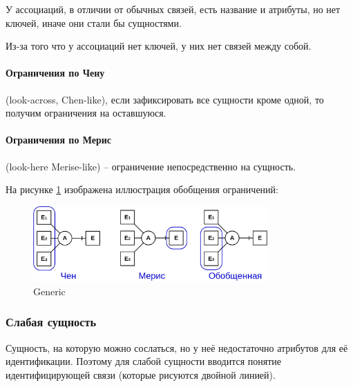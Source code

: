 \begin{remark}
	У ассоциаций, в отличии от обычных связей, есть название и атрибуты, но нет ключей, иначе они стали
	бы сущностями.
\end{remark}

\begin{remark}
	Из-за того что у ассоциаций нет ключей, у них нет связей между собой.
\end{remark}

\paragraph{Ограничения по Чену} (look-across, Chen-like), если зафиксировать все сущности кроме
одной, то получим ограничения на оставшуюся.

\paragraph{Ограничения по Мерис} (look-here Merise-like) -- ограничение непосредственно на сущность.

На рисунке \ref{restr-gen} изображена иллюстрация обобщения ограничений:

\begin{figure}[h]
	\centering
	\includegraphics[width=0.8\textwidth]{../assets/kgeorgiy/modelling/ERModel_Multi_Generic.svg.png}
	\caption{Generic}
	\label{restr-gen}
\end{figure}

\subsubsection{Слабая сущность}
Сущность, на которую можно сослаться, но у неё недостаточно атрибутов для её идентификации. Поэтому
для слабой сущности вводится понятие идентифицирующей связи (которые рисуются двойной линией).
